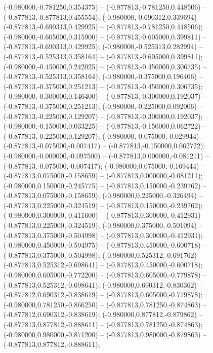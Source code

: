  (-0.980000,-0.781250,0.354375) -- (-0.877813,-0.781250,0.448506) -- (-0.877813,-0.877813,0.455554);
 (-0.980000,-0.690312,0.339694) -- (-0.877813,-0.690313,0.429925) -- (-0.877813,-0.781250,0.448506);
 (-0.980000,-0.605000,0.315900) -- (-0.877813,-0.605000,0.399811) -- (-0.877813,-0.690313,0.429925);
 (-0.980000,-0.525313,0.282994) -- (-0.877813,-0.525313,0.358164) -- (-0.877813,-0.605000,0.399811);
 (-0.980000,-0.450000,0.242025) -- (-0.877813,-0.450000,0.306735) -- (-0.877813,-0.525313,0.358164);
 (-0.980000,-0.375000,0.196406) -- (-0.877813,-0.375000,0.251213) -- (-0.877813,-0.450000,0.306735);
 (-0.980000,-0.300000,0.146400) -- (-0.877813,-0.300000,0.192037) -- (-0.877813,-0.375000,0.251213);
 (-0.980000,-0.225000,0.092006) -- (-0.877813,-0.225000,0.129207) -- (-0.877813,-0.300000,0.192037);
 (-0.980000,-0.150000,0.033225) -- (-0.877813,-0.150000,0.062722) -- (-0.877813,-0.225000,0.129207);
 (-0.980000,-0.075000,-0.029944) -- (-0.877813,-0.075000,-0.007417) -- (-0.877813,-0.150000,0.062722);
 (-0.980000,-0.000000,-0.097500) -- (-0.877813,0.000000,-0.081211) -- (-0.877813,-0.075000,-0.007417);
 (-0.980000,0.075000,-0.169444) -- (-0.877813,0.075000,-0.158659) -- (-0.877813,0.000000,-0.081211);
 (-0.980000,0.150000,-0.245775) -- (-0.877813,0.150000,-0.239762) -- (-0.877813,0.075000,-0.158659);
 (-0.980000,0.225000,-0.326494) -- (-0.877813,0.225000,-0.324519) -- (-0.877813,0.150000,-0.239762);
 (-0.980000,0.300000,-0.411600) -- (-0.877813,0.300000,-0.412931) -- (-0.877813,0.225000,-0.324519);
 (-0.980000,0.375000,-0.501094) -- (-0.877813,0.375000,-0.504998) -- (-0.877813,0.300000,-0.412931);
 (-0.980000,0.450000,-0.594975) -- (-0.877813,0.450000,-0.600718) -- (-0.877813,0.375000,-0.504998);
 (-0.980000,0.525312,-0.691762) -- (-0.877813,0.525312,-0.698641) -- (-0.877813,0.450000,-0.600718);
 (-0.980000,0.605000,-0.772200) -- (-0.877813,0.605000,-0.779878) -- (-0.877813,0.525312,-0.698641);
 (-0.980000,0.690312,-0.830362) -- (-0.877812,0.690312,-0.838619) -- (-0.877813,0.605000,-0.779878);
 (-0.980000,0.781250,-0.866250) -- (-0.877813,0.781250,-0.874863) -- (-0.877812,0.690312,-0.838619);
 (-0.980000,0.877812,-0.879862) -- (-0.877813,0.877812,-0.888611) -- (-0.877813,0.781250,-0.874863);
 (-0.980000,0.980000,-0.871200) -- (-0.877813,0.980000,-0.879863) -- (-0.877813,0.877812,-0.888611);
